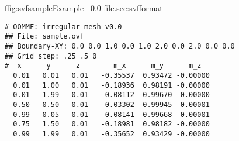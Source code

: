 \begin{codelisting}{f}{fig:svfsample}{Example \OVF\ 0.0 file.}{sec:svfformat}
\begin{verbatim}
# OOMMF: irregular mesh v0.0
## File: sample.ovf
## Boundary-XY: 0.0 0.0 1.0 0.0 1.0 2.0 0.0 2.0 0.0 0.0
## Grid step: .25 .5 0
#  x      y      z        m_x      m_y      m_z
  0.01   0.01   0.01   -0.35537  0.93472 -0.00000
  0.01   1.00   0.01   -0.18936  0.98191 -0.00000
  0.01   1.99   0.01   -0.08112  0.99670 -0.00000
  0.50   0.50   0.01   -0.03302  0.99945 -0.00001
  0.99   0.05   0.01   -0.08141  0.99668 -0.00001
  0.75   1.50   0.01   -0.18981  0.98182 -0.00000
  0.99   1.99   0.01   -0.35652  0.93429 -0.00000
\end{verbatim}
\end{codelisting}

\setcounter{secnumdepth}{\value{ffoldsecnumdepth}}
